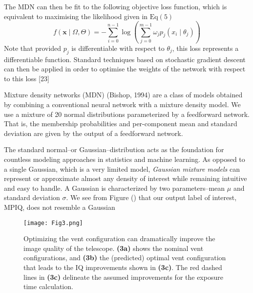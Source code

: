 The MDN can then be fit to the following objective loss function, which is equivalent to maximising the likelihood given in $\mathrm{Eq}(5)$
\[
f(\mathbf{x} \mid \Omega, \Theta)=-\sum_{i=0}^{n-1} \log \left(\sum_{j=0}^{m-1} \omega_{j} p_{j}\left(x_{i} \mid \theta_{j}\right)\right)
\]
Note that provided $p_{j}$ is differentiable with respect to $\theta_{j}$, this loss represents a differentiable function. Standard techniques based on stochastic gradient descent can then be applied in order to optimise the weights of the network with respect to this loss [23]

Mixture density networks (MDN) (Bishop, 1994) are a class of models obtained by combining a conventional neural network with a mixture density model.
We use a mixture of 20 normal distributions parameterized by a feedforward network. That is, the membership probabilities and per-component mean and standard deviation are given by the output of a feedforward network.


The standard normal--or Gaussian--distribution acts as the
foundation for countless modeling approaches in statistics
and machine learning. As opposed to a single Gaussian,
which is a very limited model, \emph{Gaussian mixture models} can represent or approximate almost any density
of interest while remaining intuitive and easy to handle. A Gaussian is characterized by two parameters--mean $\mu$ and standard deviation $\sigma$. We see from Figure () that our output label of interest, MPIQ, does not resemble a Gaussian

\begin{figure*}
   \centering
    \texttt{[image: Fig3.png]}
    \caption{Optimizing the vent configuration can dramatically improve the image quality of the telescope. \textbf{(3a)} shows the nominal vent configurations, and \textbf{(3b)} the (predicted) optimal vent configuration that leads to the IQ improvements shown in \textbf{(3c)}. The red dashed lines in \textbf{(3c)} delineate the assumed improvements for the exposure time calculation.}
    \label{fig:actionable}
\end{figure*}

\iffalse
\begin{figure*}
    \centering
    \begin{subfigure}
    \texttt{[image: shap\_heatmap\_goodsmall.png]}
    \caption{Caption}
    \label{fig:my_label}
    \end{subfigure}
\end{figure*}
\fi
{}
